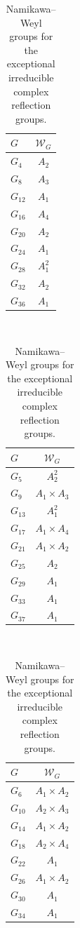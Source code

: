 \documentclass[10pt,a4paper]{amsart}
\begin{document}
\begin{table}[h]
  \caption{Namikawa--Weyl groups for the exceptional irreducible complex reflection groups.}
  \label{tab:compexcep}
  \begin{tabular}{|l|c|}
    \(G\)      &  \(\mathcal W_G\) \\
    \hline
    \(G_4\)    & \(A_2\)   \\
    \(G_8\)    & \(A_3\)   \\
    \(G_{12}\) & \(A_1\)   \\
    \(G_{16}\) & \(A_4\)   \\
    \(G_{20}\) & \(A_2\)   \\
    \(G_{24}\) & \(A_1\)   \\
    \(G_{28}\) & \(A_1^2\) \\
    \(G_{32}\) & \(A_2\)   \\
    \(G_{36}\) & \(A_1\)
  \end{tabular}~
  \begin{tabular}{|l|c|}
    \(G\)      &  \(\mathcal W_G\) \\
    \hline
    \(G_5\)    & \(A_2^2\)                  \\
    \(G_9\)    & \(A_1\times A_3\) \\
    \(G_{13}\) & \(A_1^2\)                  \\
    \(G_{17}\) & \(A_1\times A_4\) \\
    \(G_{21}\) & \(A_1\times A_2\) \\
    \(G_{25}\) & \(A_2\)                    \\
    \(G_{29}\) & \(A_1\)                    \\
    \(G_{33}\) & \(A_1\)                    \\
    \(G_{37}\) & \(A_1\)
  \end{tabular}~
  \begin{tabular}{|l|c|}
    \(G\)      & \(\mathcal W_G\) \\
    \hline
    \(G_6\)    & \(A_1\times A_2\) \\
    \(G_{10}\) & \(A_2\times A_3\) \\
    \(G_{14}\) & \(A_1\times A_2\) \\
    \(G_{18}\) & \(A_2\times A_4\) \\
    \(G_{22}\) & \(A_1\)                    \\
    \(G_{26}\) & \(A_1\times A_2\) \\
    \(G_{30}\) & \(A_1\)                    \\
    \(G_{34}\) & \(A_1\)                    \\

\end{tabular}
\end{table}
\end{document}
